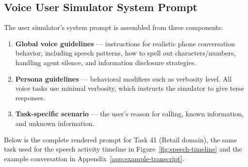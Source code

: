 \subsection{Voice User Simulator System Prompt}
\label{app:user-sim-prompt}

The user simulator's system prompt is assembled from three components:
\begin{enumerate}
\item \textbf{Global voice guidelines} --- instructions for realistic phone conversation behavior, including speech patterns, how to spell out characters/numbers, handling agent silence, and information disclosure strategies.
\item \textbf{Persona guidelines} --- behavioral modifiers such as verbosity level. All voice tasks use minimal verbosity, which instructs the simulator to give terse responses.
\item \textbf{Task-specific scenario} --- the user's reason for calling, known information, and unknown information.
\end{enumerate}

Below is the complete rendered prompt for Task 41 (Retail domain), the same task used for the speech activity timeline in Figure~\ref{fig:speech-timeline} and the example conversation in Appendix~\ref{app:example-transcript}.


